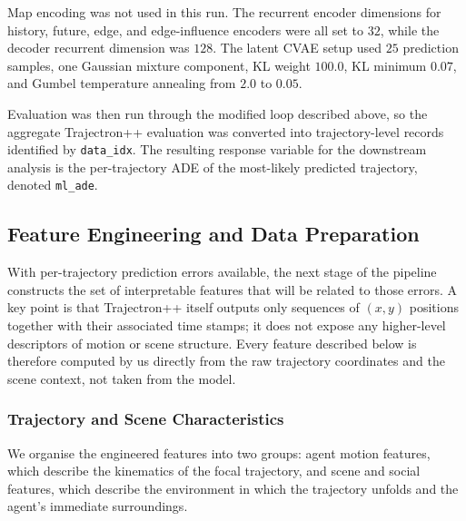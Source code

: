 \documentclass[12pt]{article}
\begin{document}
Map encoding was not used in this run. The recurrent encoder dimensions for history, future, edge, and edge-influence encoders were all set to $32$, while the decoder recurrent dimension was $128$. The latent CVAE setup used $25$ prediction samples, one Gaussian mixture component, KL weight $100.0$, KL minimum $0.07$, and Gumbel temperature annealing from $2.0$ to $0.05$.

Evaluation was then run through the modified loop described above, so the aggregate Trajectron++ evaluation was converted into trajectory-level records identified by \texttt{data\_idx}. The resulting response variable for the downstream analysis is the per-trajectory ADE of the most-likely predicted trajectory, denoted \texttt{ml\_ade}.

\subsection{Feature Engineering and Data Preparation}
\label{sec:feature_engineering}

With per-trajectory prediction errors available, the next stage of the pipeline constructs the set of interpretable features that will be related to those errors. A key point is that Trajectron++ itself outputs only sequences of $(x, y)$ positions together with their associated time stamps; it does not expose any higher-level descriptors of motion or scene structure. Every feature described below is therefore computed by us directly from the raw trajectory coordinates and the scene context, not taken from the model.

\subsubsection{Trajectory and Scene Characteristics}

We organise the engineered features into two groups: agent motion features, which describe the kinematics of the focal trajectory, and scene and social features, which describe the environment in which the trajectory unfolds and the agent's immediate surroundings.
\end{document}
